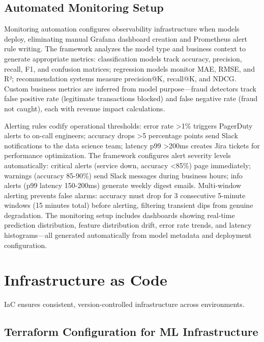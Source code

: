 \subsection{Automated Monitoring Setup}

Monitoring automation configures observability infrastructure when models deploy, eliminating manual Grafana dashboard creation and Prometheus alert rule writing. The framework analyzes the model type and business context to generate appropriate metrics: classification models track accuracy, precision, recall, F1, and confusion matrices; regression models monitor MAE, RMSE, and R²; recommendation systems measure precision@K, recall@K, and NDCG. Custom business metrics are inferred from model purpose---fraud detectors track false positive rate (legitimate transactions blocked) and false negative rate (fraud not caught), each with revenue impact calculations.

Alerting rules codify operational thresholds: error rate >1\% triggers PagerDuty alerts to on-call engineers; accuracy drops >5 percentage points send Slack notifications to the data science team; latency p99 >200ms creates Jira tickets for performance optimization. The framework configures alert severity levels automatically: critical alerts (service down, accuracy <85\%) page immediately; warnings (accuracy 85-90\%) send Slack messages during business hours; info alerts (p99 latency 150-200ms) generate weekly digest emails. Multi-window alerting prevents false alarms: accuracy must drop for 3 consecutive 5-minute windows (15 minutes total) before alerting, filtering transient dips from genuine degradation. The monitoring setup includes dashboards showing real-time prediction distribution, feature distribution drift, error rate trends, and latency histograms---all generated automatically from model metadata and deployment configuration.

\section{Infrastructure as Code}

IaC ensures consistent, version-controlled infrastructure across environments.

\subsection{Terraform Configuration for ML Infrastructure}

